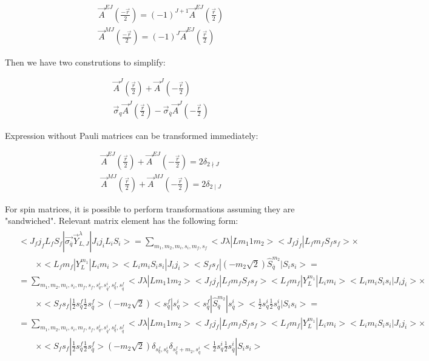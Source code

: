 \begin{align}
    &\vec{A}^{EJ}(\frac{-\vec{r}}{2}) = (-1)^{J+1} \vec{A}^{EJ}(\frac{\vec{r}}{2}) \\
    &\vec{A}^{MJ}(\frac{-\vec{r}}{2}) = (-1)^{J} \vec{A}^{EJ}(\frac{\vec{r}}{2})
\end{align}

Then we have two construtions to simplify:

\begin{align}
    &\vec{A}^{J}(\frac{\vec{r}}{2}) + \vec{A}^{J}(-\frac{\vec{r}}{2}) \\
    &\vec{\sigma}_{q} \vec{A}^{J}(\frac{\vec{r}}{2}) - \vec{\sigma}_{\overline{q}} \vec{A}^{J}(-\frac{\vec{r}}{2}) \label{eq:sigmaAJ}
\end{align}

Expression without Pauli matrices can be transformed immediately:

\begin{align}
    &\vec{A}^{EJ}(\frac{\vec{r}}{2}) + \vec{A}^{EJ}(-\frac{\vec{r}}{2}) = 2 \delta_{2 \nmid J} \\
    &\vec{A}^{MJ}(\frac{\vec{r}}{2}) + \vec{A}^{MJ}(-\frac{\vec{r}}{2}) = 2 \delta_{2 \mid J}
\end{align}

For spin matrices, it is possible to perform transformations assuming they are "sandwiched". Relevant matrix element has the following form:
\begin{align}
    \begin{split}
        &<J_f j_f L_f S_f| \vec{\sigma_{\overline{q}}} \vec{Y}_{L, J}^\lambda |J_i j_i L_i S_i> = \sum_{m_1, m_2, m_i, s_i, m_f, s_f} <J \lambda| L m_1 1 m_2> <J_f j_f| L_f m_f S_f s_f> \times\\
        &\qquad\times <L_f m_f| Y_{L}^{m_1} |L_i m_i>  <L_i m_i S_i s_i| J_i j_i> <S_f s_f| (-m_2\sqrt{2}) \hat{S}_{\overline{q}}^{m_2} |S_i s_i> = \\
        &= \sum_{m_1, m_2, m_i, s_i, m_f, s_f, s^i_{q}, s^{i}_{\overline{q}}, s^{f}_{q}, s^{f}_{\overline{q}}} <J \lambda| L m_1 1 m_2> <J_f j_f| L_f m_f S_f s_f> <L_f m_f| Y_{L}^{m_1} |L_i m_i>  <L_i m_i S_i s_i| J_i j_i> \times\\
        &\qquad\times <S_f s_f| \frac{1}{2} s^f_{q} \frac{1}{2} s^f_{\overline{q}}>  (-m_2\sqrt{2}) <s^f_{q}|s^{i}_{q}> <s^f_{\overline{q}}| \hat{S}_{\overline{q}}^{m_2} |s^i_{\overline{q}}> <\frac{1}{2} s^i_{q} \frac{1}{2} s^i_{\overline{q}} |S_i s_i> =\\
        &= \sum_{m_1, m_2, m_i, s_i, m_f, s_f, s^i_{q}, s^{i}_{\overline{q}}, s^{f}_{q}, s^{f}_{\overline{q}}} <J \lambda| L m_1 1 m_2> <J_f j_f| L_f m_f S_f s_f> <L_f m_f| Y_{L}^{m_1} |L_i m_i>  <L_i m_i S_i s_i| J_i j_i> \times\\
        &\qquad\times <S_f s_f| \frac{1}{2} s^f_{q} \frac{1}{2} s^f_{\overline{q}}>  (-m_2\sqrt{2}) \delta_{s^f_{q}, s^{i}_{q}} \delta_{s^f_{\overline{q}} + m_2, s^i_{\overline{q}}} <\frac{1}{2} s^i_{q} \frac{1}{2} s^i_{\overline{q}} |S_i s_i>
    \end{split}
\end{align}

